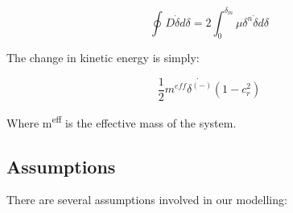 \documentclass[12pt]{report}
\begin{document}
 \[  \]  \[  \oint _{}^{}D\dot{ \delta } d \delta = 2 \int _{0}^{ \delta _{m}} \mu  \delta ^{n}\dot{ \delta } d \delta  \] \par

The change in kinetic energy is simply:\par

 \[ \frac{1}{2}m^{eff}\dot{ \delta ^{ \left( - \right) }} \left( 1-c_{r}^{2} \right)  \] \par

Where m\textsuperscript{eff} is the effective mass of the system.\par

\subsection*{Assumptions}
There are several assumptions involved in our modelling:\par
\end{document}
